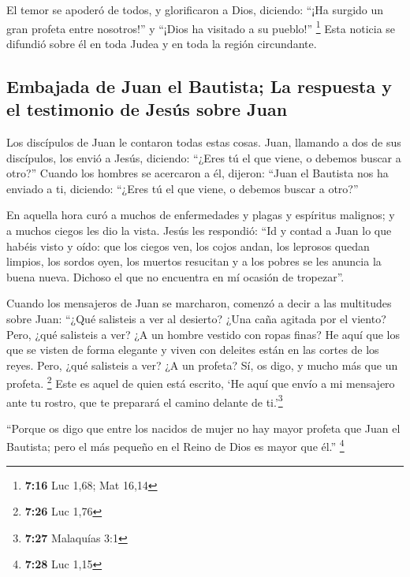  El temor se apoderó de todos, y glorificaron a Dios,
diciendo: ``¡Ha surgido un gran profeta entre nosotros!'' y ``¡Dios ha
visitado a su pueblo!'' \footnote{\textbf{7:16} Luc 1,68; Mat 16,14}
 Esta noticia se difundió sobre él en toda Judea y en
toda la región circundante.

\hypertarget{embajada-de-juan-el-bautista-la-respuesta-y-el-testimonio-de-jesuxfas-sobre-juan}{%
\subsection{Embajada de Juan el Bautista; La respuesta y el testimonio
de Jesús sobre
Juan}\label{embajada-de-juan-el-bautista-la-respuesta-y-el-testimonio-de-jesuxfas-sobre-juan}}

 Los discípulos de Juan le contaron todas estas cosas.
 Juan, llamando a dos de sus discípulos, los envió a
Jesús, diciendo: ``¿Eres tú el que viene, o debemos buscar a otro?''
 Cuando los hombres se acercaron a él, dijeron: ``Juan el
Bautista nos ha enviado a ti, diciendo: ``¿Eres tú el que viene, o
debemos buscar a otro?''

 En aquella hora curó a muchos de enfermedades y plagas y
espíritus malignos; y a muchos ciegos les dio la vista. 
Jesús les respondió: ``Id y contad a Juan lo que habéis visto y oído:
que los ciegos ven, los cojos andan, los leprosos quedan limpios, los
sordos oyen, los muertos resucitan y a los pobres se les anuncia la
buena nueva.  Dichoso el que no encuentra en mí ocasión
de tropezar''.

 Cuando los mensajeros de Juan se marcharon, comenzó a
decir a las multitudes sobre Juan: ``¿Qué salisteis a ver al desierto?
¿Una caña agitada por el viento?  Pero, ¿qué salisteis a
ver? ¿A un hombre vestido con ropas finas? He aquí que los que se visten
de forma elegante y viven con deleites están en las cortes de los reyes.
 Pero, ¿qué salisteis a ver? ¿A un profeta? Sí, os digo,
y mucho más que un profeta. \footnote{\textbf{7:26} Luc 1,76}
 Este es aquel de quien está escrito, `He aquí que envío
a mi mensajero ante tu rostro, que te preparará el camino delante de
ti.'\footnote{\textbf{7:27} Malaquías 3:1}

 ``Porque os digo que entre los nacidos de mujer no hay
mayor profeta que Juan el Bautista; pero el más pequeño en el Reino de
Dios es mayor que él.'' \footnote{\textbf{7:28} Luc 1,15}

